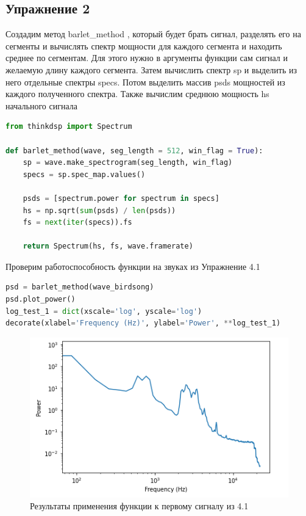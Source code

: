 \subsection{Упражнение 2}

Создадим метод barlet_method \cite{barlett}, который будет брать сигнал, разделять его на сегменты и вычислять спектр мощности для каждого сегмента и находить среднее по сегментам. Для этого нужно в аргументы функции сам сигнал и желаемую длину каждого сегмента. Затем вычислить спектр sp и выделить из него отдельные спектры specs. Потом выделить массив psds мощностей из каждого полученного спектра. Также вычислим среднюю мощность hs начального сигнала

\begin{lstlisting}[language=Python]
from thinkdsp import Spectrum

def barlet_method(wave, seg_length = 512, win_flag = True):
    sp = wave.make_spectrogram(seg_length, win_flag)
    specs = sp.spec_map.values()

    psds = [spectrum.power for spectrum in specs]
    hs = np.sqrt(sum(psds) / len(psds))
    fs = next(iter(specs)).fs

    return Spectrum(hs, fs, wave.framerate)
\end{lstlisting}

Проверим работоспособность функции на звуках из Упражнение 4.1

\begin{lstlisting}[language=Python]
psd = barlet_method(wave_birdsong)
psd.plot_power()
log_test_1 = dict(xscale='log', yscale='log')
decorate(xlabel='Frequency (Hz)', ylabel='Power', **log_test_1)
\end{lstlisting}

\begin{figure}[H]
	\begin{center}
		\includegraphics[scale=1]{fig/lab04/lab04_05.png}
		\caption{Результаты применения функции к первому сигналу из 4.1}
	\end{center}
\end{figure}

